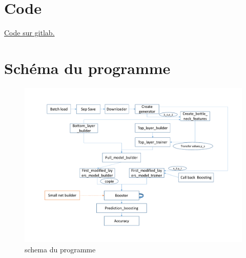 \documentclass[11 pt]{article}
\begin{document}
\begin{appendices}
  \section{Code}
    \href{https://gitlab.com/zlanderous/transboost}{Code sur gitlab.}

  \section{Schéma du programme}
  \begin{figure}[h]
    \includegraphics[width=\textwidth]{figTot.pdf}
    \caption{schema du programme}
    \label{figTot}
  \end{figure}
\end{appendices}
\end{document}
